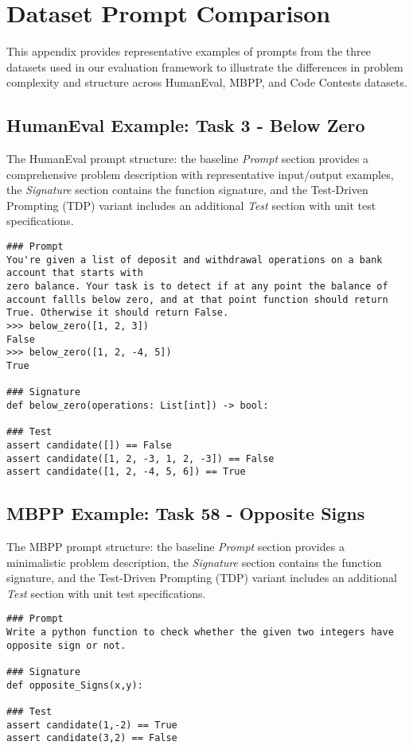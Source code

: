 \documentclass{article}
\begin{document}
\section*{Dataset Prompt Comparison}
\label{appendix:prompt_comparison}

This appendix provides representative examples of prompts from the three datasets used in our evaluation framework to illustrate the differences in problem complexity and structure across HumanEval, MBPP, and Code Contests datasets.

\subsection*{HumanEval Example: Task 3 - Below Zero}

The HumanEval prompt structure: the baseline \textit{Prompt} section provides a comprehensive problem description with representative input/output examples, the \textit{Signature} section contains the function signature, and the Test-Driven Prompting (TDP) variant includes an additional \textit{Test} section with unit test specifications.

\begin{lstlisting}[language={}]
### Prompt
You're given a list of deposit and withdrawal operations on a bank account that starts with
zero balance. Your task is to detect if at any point the balance of account fallls below zero, and at that point function should return True. Otherwise it should return False.
>>> below_zero([1, 2, 3])
False
>>> below_zero([1, 2, -4, 5])
True

### Signature
def below_zero(operations: List[int]) -> bool:

### Test
assert candidate([]) == False
assert candidate([1, 2, -3, 1, 2, -3]) == False
assert candidate([1, 2, -4, 5, 6]) == True
\end{lstlisting}

\subsection*{MBPP Example: Task 58 - Opposite Signs}

The MBPP prompt structure: the baseline \textit{Prompt} section provides a minimalistic problem description, the \textit{Signature} section contains the function signature, and the Test-Driven Prompting (TDP) variant includes an additional \textit{Test} section with unit test specifications.

\begin{lstlisting}[language={}]
### Prompt
Write a python function to check whether the given two integers have opposite sign or not.

### Signature
def opposite_Signs(x,y):

### Test
assert candidate(1,-2) == True
assert candidate(3,2) == False
\end{lstlisting}
\end{document}
